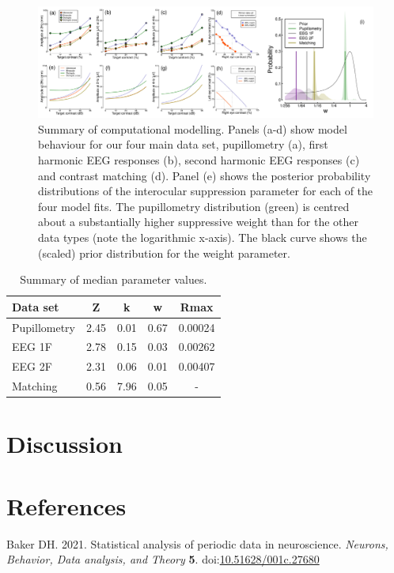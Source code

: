 \documentclass[
]{article}
\newlength{\cslhangindent}
\newlength{\cslentryspacingunit} %
\newenvironment{CSLReferences}[2] %
 {%
  \setlength{\parindent}{0pt}
  \ifodd #1
  \let\oldpar\par
  \def\par{\hangindent=\cslhangindent\oldpar}
  \fi
  \setlength{\parskip}{#2\cslentryspacingunit}
 }%
 {}
\begin{document}
\begin{figure}

{\centering \includegraphics{Figures/modelfigure} 

}

\caption{Summary of computational modelling. Panels (a-d) show model behaviour for our four main data set, pupillometry (a), first harmonic EEG responses (b), second harmonic EEG responses (c) and contrast matching (d). Panel (e) shows the posterior probability distributions of the interocular suppression parameter for each of the four model fits. The pupillometry distribution (green) is centred about a substantially higher suppressive weight than for the other data types (note the logarithmic x-axis). The black curve shows the (scaled) prior distribution for the weight parameter.}\label{fig:modelfigure}
\end{figure}

\begin{table}

\caption{\label{tab:paramtable}Summary of median parameter values.}
\centering
\begin{tabular}[t]{l|c|c|c|c}
\hline
Data set & Z & k & w & Rmax\\
\hline
Pupillometry & 2.45 & 0.01 & 0.67 & 0.00024\\
\hline
EEG 1F & 2.78 & 0.15 & 0.03 & 0.00262\\
\hline
EEG 2F & 2.31 & 0.06 & 0.01 & 0.00407\\
\hline
Matching & 0.56 & 7.96 & 0.05 & -\\
\hline
\end{tabular}
\end{table}

\hypertarget{discussion}{%
\section{Discussion}\label{discussion}}

\hypertarget{references}{%
\section*{References}\label{references}}

\hypertarget{refs}{}
\begin{CSLReferences}{1}{0}
\leavevmode{}%
Baker DH. 2021. Statistical analysis of periodic data in neuroscience. \emph{Neurons, Behavior, Data analysis, and Theory} \textbf{5}. doi:\href{https://doi.org/10.51628/001c.27680}{10.51628/001c.27680}

\end{CSLReferences}
\end{document}
